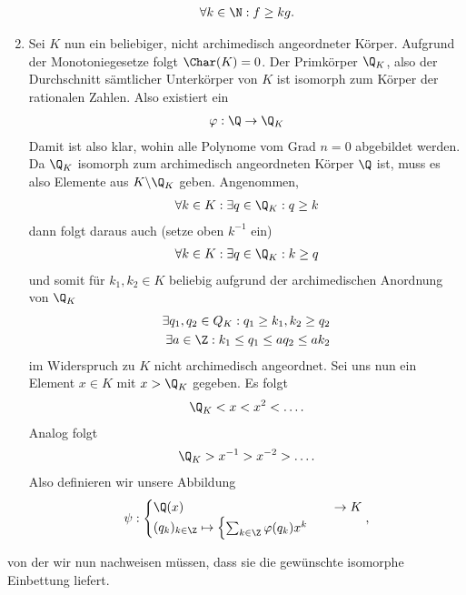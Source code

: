 \begin{solution}
\begin{enumerate}
  \begin{align*}
    \forall k \in \N: f \geq kg.
  \end{align*}
  \item Sei $K$ nun ein beliebiger, nicht archimedisch angeordneter Körper.
  Aufgrund der Monotoniegesetze folgt $\Char(K) = 0$.
  Der Primkörper $\Q_K$, also der Durchschnitt sämtlicher Unterkörper von $K$
  ist isomorph zum Körper der rationalen Zahlen. Also existiert ein
  \begin{align*}
    \varphi: \Q \to \Q_K
  \end{align*}
  Damit ist also klar, wohin
  alle Polynome vom Grad $n = 0$ abgebildet werden.
  Da $\Q_K$ isomorph zum archimedisch angeordneten Körper $\Q$ ist,
  muss es also Elemente aus $K \backslash \Q_K$ geben.
  Angenommen,
  \begin{align*}
    \forall k \in K: \exists q \in \Q_K: q \geq k
  \end{align*}
  dann folgt daraus auch (setze oben $k^{-1}$ ein)
  \begin{align*}
    \forall k \in K: \exists q \in \Q_K: k \geq q
  \end{align*}
  und somit für $k_1, k_2 \in K$ beliebig aufgrund der archimedischen Anordnung von $\Q_K$
  \begin{align*}
    \exists q_1,q_2 \in Q_K: q_1 \geq k_1, k_2 \geq q_2 \\
    \exists a \in \Z: k_1 \leq q_1 \leq aq_2 \leq ak_2
  \end{align*}
  im Widerspruch zu $K$ nicht archimedisch angeordnet.
  Sei uns nun ein Element $x \in K$ mit $x > \Q_K$ gegeben. Es folgt
  \begin{align*}
    \Q_K < x < x^2 < \dots.
  \end{align*}
  Analog folgt
  \begin{align*}
    \Q_K > x^{-1} > x^{-2} > \dots.
  \end{align*}
  Also definieren wir unsere Abbildung
  \begin{align*}
    \psi: \begin{cases}
      \Q(x) &\to K \\
      (q_k)_{k \in \Z} \mapsto
      \begin{cases}
        \sum_{k \in \Z}\varphi(q_k)x^k
      \end{cases}
    \end{cases},
  \end{align*}
\end{enumerate}
von der wir nun nachweisen müssen, dass sie die gewünschte isomorphe Einbettung liefert.

\end{solution}

